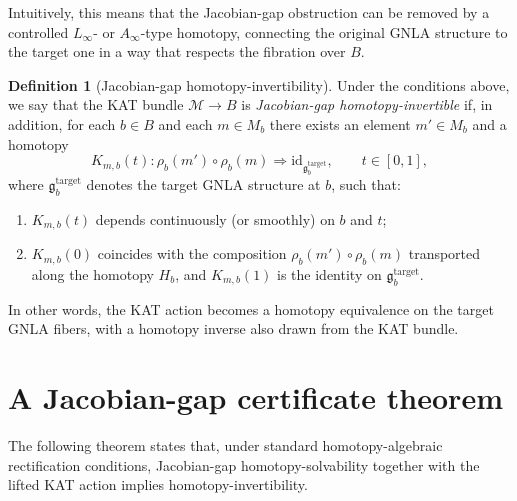 \documentclass[11pt]{book}
\theoremstyle{plain}
\theoremstyle{definition}
\newtheorem{definition}[theorem]{Definition}
\theoremstyle{remark}
\begin{document}
Intuitively, this means that the Jacobian-gap obstruction can be
removed by a controlled $L_\infty$- or $A_\infty$-type homotopy,
connecting the original GNLA structure to the target one in a way that
respects the fibration over $B$.

\begin{definition}[Jacobian-gap homotopy-invertibility]
Under the conditions above, we say that the KAT bundle
$\mathcal{M}\to B$ is \emph{Jacobian-gap homotopy-invertible} if, in
addition, for each $b\in B$ and each $m\in M_b$ there exists an element
$m'\in M_b$ and a homotopy
\[
  K_{m,b}(t):
  \rho_b(m')\circ\rho_b(m)
  \Rightarrow
  \mathrm{id}_{\mathfrak{g}_b^{\mathrm{target}}},
  \qquad t\in[0,1],
\]
where $\mathfrak{g}_b^{\mathrm{target}}$ denotes the target GNLA
structure at $b$, such that:
\begin{enumerate}[label=(\roman*)]
  \item $K_{m,b}(t)$ depends continuously (or smoothly) on $b$ and $t$;
  \item $K_{m,b}(0)$ coincides with the composition
        $\rho_b(m')\circ\rho_b(m)$ transported along the homotopy
        $H_b$, and $K_{m,b}(1)$ is the identity on
        $\mathfrak{g}_b^{\mathrm{target}}$.
\end{enumerate}
In other words, the KAT action becomes a homotopy equivalence on the
target GNLA fibers, with a homotopy inverse also drawn from the KAT
bundle.
\end{definition}

\section{A Jacobian-gap certificate theorem}

The following theorem states that, under standard homotopy-algebraic
rectification conditions, Jacobian-gap homotopy-solvability together
with the lifted KAT action implies homotopy-invertibility.
\end{document}
